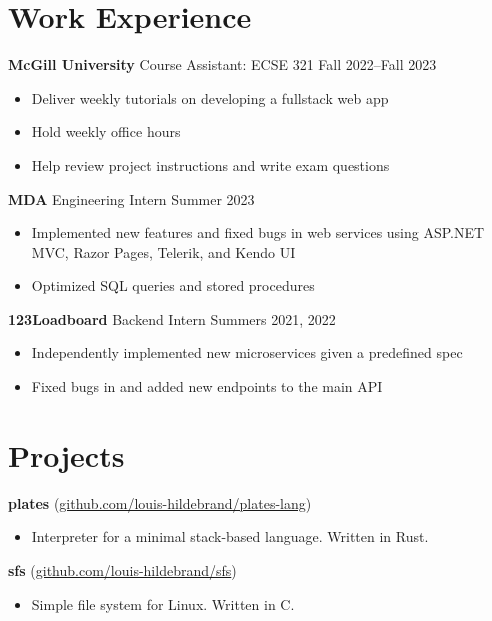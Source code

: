\documentclass[12pt]{article}
\begin{document}
\section*{Work Experience}

\textbf{McGill University} Course Assistant: ECSE 321
\hfill
Fall 2022--Fall 2023
\begin{itemize}
	\item Deliver weekly tutorials on developing a fullstack web app
	\item Hold weekly office hours
	\item Help review project instructions and write exam questions
\end{itemize}

\textbf{MDA} Engineering Intern
\hfill
Summer 2023
\begin{itemize}
	\item Implemented new features and fixed bugs in web services using ASP.NET MVC, Razor Pages, Telerik, and Kendo UI
	\item Optimized SQL queries and stored procedures
\end{itemize}

\textbf{123Loadboard} Backend Intern
\hfill
Summers 2021, 2022
\begin{itemize}
	\item Independently implemented new microservices given a predefined spec
	\item Fixed bugs in and added new endpoints to the main API
\end{itemize}

\section*{Projects}

\textbf{plates} (\href{https://github.com/louis-hildebrand/plates-lang}{github.com/louis-hildebrand/plates-lang})
\begin{itemize}
	\item Interpreter for a minimal stack-based language. Written in Rust.
\end{itemize}

\textbf{sfs} (\href{https://github.com/louis-hildebrand/sfs}{github.com/louis-hildebrand/sfs})
\begin{itemize}
	\item Simple file system for Linux. Written in C.
\end{itemize}
\end{document}
